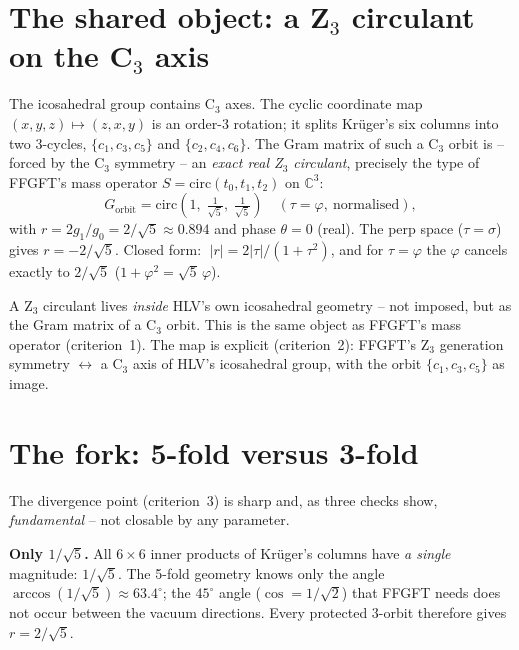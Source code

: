 \section{The shared object: a Z$_3$ circulant on the C$_3$ axis}

The icosahedral group contains C$_3$ axes. The cyclic coordinate map
$(x,y,z)\mapsto(z,x,y)$ is an order-3 rotation; it splits Kr\"uger's six columns
into two 3-cycles, $\{c_1,c_3,c_5\}$ and $\{c_2,c_4,c_6\}$. The Gram matrix of such
a C$_3$ orbit is -- forced by the C$_3$ symmetry -- an \emph{exact real Z$_3$
circulant}, precisely the type of FFGFT's mass operator
$S=\mathrm{circ}(t_0,t_1,t_2)$ on $\mathbb{C}^3$:
\[
G_{\text{orbit}}=\mathrm{circ}\!\left(1,\;\tfrac{1}{\sqrt5},\;\tfrac{1}{\sqrt5}\right)
\quad(\tau=\varphi,\ \text{normalised}),
\]
with $r=2g_1/g_0=2/\sqrt5\approx0.894$ and phase $\theta=0$ (real). The perp space
($\tau=\sigma$) gives $r=-2/\sqrt5$. Closed form: $\;|r|=2|\tau|/(1+\tau^2)$, and for
$\tau=\varphi$ the $\varphi$ cancels exactly to $2/\sqrt5$
($1+\varphi^2=\sqrt5\,\varphi$).

\begin{keyresult}
A Z$_3$ circulant lives \emph{inside} HLV's own icosahedral geometry -- not imposed,
but as the Gram matrix of a C$_3$ orbit. This is the same object as FFGFT's mass
operator (criterion~1). The map is explicit (criterion~2): FFGFT's Z$_3$ generation
symmetry $\leftrightarrow$ a C$_3$ axis of HLV's icosahedral group, with the orbit
$\{c_1,c_3,c_5\}$ as image.
\end{keyresult}

\section{The fork: 5-fold versus 3-fold}

The divergence point (criterion~3) is sharp and, as three checks show,
\emph{fundamental} -- not closable by any parameter.

\textbf{Only $1/\sqrt5$.} All $6\times6$ inner products of Kr\"uger's columns have
\emph{a single} magnitude: $1/\sqrt5$. The 5-fold geometry knows only the angle
$\arccos(1/\sqrt5)\approx63.4^\circ$; the $45^\circ$ angle ($\cos=1/\sqrt2$) that
FFGFT needs does not occur between the vacuum directions. Every protected 3-orbit
therefore gives $r=2/\sqrt5$.

